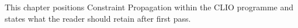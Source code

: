 This chapter positions Constraint Propagation within the CLIO programme and states what the reader should retain after first pass.
